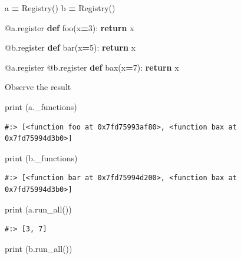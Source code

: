 \documentclass[
]{book}
\newenvironment{Shaded}{\begin{snugshade}}{\end{snugshade}}
\newcommand{\AttributeTok}[1]{\textcolor[rgb]{0.61,0.61,0.61}{#1}}
\newcommand{\BuiltInTok}[1]{#1}
\newcommand{\ControlFlowTok}[1]{\textcolor[rgb]{0.27,0.27,0.27}{\textbf{#1}}}
\newcommand{\DecValTok}[1]{\textcolor[rgb]{0.06,0.06,0.06}{#1}}
\newcommand{\KeywordTok}[1]{\textcolor[rgb]{0.27,0.27,0.27}{\textbf{#1}}}
\newcommand{\NormalTok}[1]{#1}
\newcommand{\OperatorTok}[1]{\textcolor[rgb]{0.43,0.43,0.43}{\textbf{#1}}}
\begin{document}
\begin{Shaded}
\begin{Highlighting}[]
\NormalTok{a }\OperatorTok{=}\NormalTok{ Registry()}
\NormalTok{b }\OperatorTok{=}\NormalTok{ Registry()}

\AttributeTok{@a.register}
\KeywordTok{def}\NormalTok{ foo(x}\OperatorTok{=}\DecValTok{3}\NormalTok{):}
    \ControlFlowTok{return}\NormalTok{ x}

\AttributeTok{@b.register}
\KeywordTok{def}\NormalTok{ bar(x}\OperatorTok{=}\DecValTok{5}\NormalTok{):}
    \ControlFlowTok{return}\NormalTok{ x}

\AttributeTok{@a.register}
\AttributeTok{@b.register}
\KeywordTok{def}\NormalTok{ bax(x}\OperatorTok{=}\DecValTok{7}\NormalTok{):}
    \ControlFlowTok{return}\NormalTok{ x}
\end{Highlighting}
\end{Shaded}

Observe the result

\begin{Shaded}
\begin{Highlighting}[]
\BuiltInTok{print}\NormalTok{ (a._functions)}
\end{Highlighting}
\end{Shaded}

\begin{verbatim}
#:> [<function foo at 0x7fd75993af80>, <function bax at 0x7fd75994d3b0>]
\end{verbatim}

\begin{Shaded}
\begin{Highlighting}[]
\BuiltInTok{print}\NormalTok{ (b._functions)}
\end{Highlighting}
\end{Shaded}

\begin{verbatim}
#:> [<function bar at 0x7fd75994d200>, <function bax at 0x7fd75994d3b0>]
\end{verbatim}

\begin{Shaded}
\begin{Highlighting}[]
\BuiltInTok{print}\NormalTok{ (a.run_all())}
\end{Highlighting}
\end{Shaded}

\begin{verbatim}
#:> [3, 7]
\end{verbatim}

\begin{Shaded}
\begin{Highlighting}[]
\BuiltInTok{print}\NormalTok{ (b.run_all())}
\end{Highlighting}
\end{Shaded}
\end{document}
